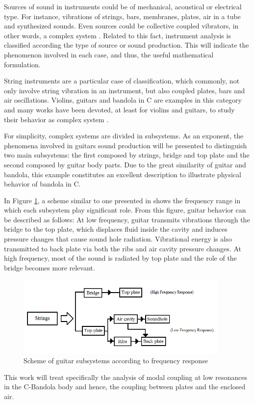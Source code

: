 Sources of sound in instruments could be of mechanical, acoustical or electrical type. For instance, vibrations of strings, bars, membranes, plates, air in a tube and synthesized sounds. Even sources could be collective coupled vibrators, in other words, a complex system \cite{Rossing}. Related to this fact, instrument analysis is classified according the type of source or sound production. This will indicate the phenomenon involved in each case, and thus, the useful mathematical formulation.

String instruments are a particular case of classification, which commonly, not only involve string vibration in an instrument, but also coupled plates, bars and air oscillations. Violins, guitars and bandola in C are examples in this category and many works have been devoted, at least for violins and guitars, to study their behavior as complex system \cite{Rossing,Christensen, Christensen3, Caldersmith1, Dickens1, Firth1}.

For simplicity, complex systems are divided in subsystems. As an exponent, the phenomena involved in guitars sound production will be presented to distinguish two main subsystems: the first composed by strings, bridge and top plate and the second composed by guitar body parts. Due to the great similarity of guitar and bandola, this example constitutes an excellent description to illustrate physical behavior of bandola in C.

In Figure \ref{GuitarScheme}, a scheme similar to one presented in \cite{Rossing} shows the frequency range in which each subsystem play significant role. From this figure, guitar behavior can be described  as follows: At low frequency, guitar transmits vibrations through the bridge to the top plate, which displaces fluid inside the cavity and induces pressure changes that cause sound hole radiation. Vibrational energy is also transmitted to back plate via both the ribs and air cavity pressure changes. At high frequency, most of the sound is radiated by top plate and the role of the bridge becomes more relevant.  

\begin{figure}[h]
\centering
\includegraphics[height=4cm]{img/GuitarScheme.png}
\caption{Scheme of guitar subsystems according to frequency response}
\label{GuitarScheme}
\end{figure}

This work will treat specifically the analysis of modal coupling at low resonances in the C-Bandola body and hence, the coupling between plates and the enclosed air. 